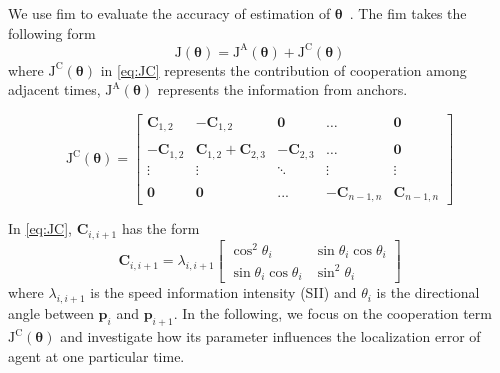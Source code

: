 \documentclass[conference]{IEEEtran}
\begin{document}
We use \ac{fim} to evaluate the accuracy of estimation of $\bm{\theta}$~\cite{LimitBound2}. The \ac{fim} takes the following form
\begin{equation}
\bm{\mathrm{J}}(\bm{\theta})=\bm{\mathrm{J}}^\mathrm{A}(\bm{\theta})+\bm{\mathrm{J}}^\mathrm{C}(\bm{\theta})
\end{equation}
where $\bm{\mathrm{J}}^\mathrm{C}(\bm{\theta})$ in \eqref{eq:JC} represents the contribution of cooperation among adjacent times, $\bm{\mathrm{J}}^\mathrm{A}(\bm{\theta})$ represents the information from anchors. 
\begin{figure}[t]
\begin{equation}\label{eq:JC}
\bm{\mathrm{J}}^\mathrm{C}(\bm{\theta})=
\begin{bmatrix}
\bm{C}_{1,2}&-\bm{C}_{1,2}&\bm{0}&\dots&\bm{0}\\
&&&&\\
-\bm{C}_{1,2} & \bm{C}_{1,2}+\bm{C}_{2,3}&-\bm{C}_{2,3}&\dots&\bm{0}\\
\vdots &\vdots&\ddots &\vdots&\vdots\\
&&&&\\
\bm{0}&\bm{0}&...& -\bm{C}_{n-1,n}&\bm{C}_{n-1,n}
\end{bmatrix}
\end{equation}
\hrulefill
\end{figure}
In \eqref{eq:JC}, $\bm{C}_{i,i+1}$ has the form
\begin{equation}
\bm{C}_{i,i+1}=\lambda_{i,i+1}\begin{bmatrix}
\cos^2 \theta_i & \sin \theta_i \cos \theta_i\\
\sin \theta_i \cos \theta_i & \sin^2 \theta_i 
\end{bmatrix}
\end{equation}
where $\lambda_{i,i+1}$ is the speed information intensity (SII) \cite{LimitBound2} 
and $\theta_i$ is the directional angle between $\bm{p}_i$ and $\bm{p}_{i+1}$. 
In the following, we focus on the cooperation term $\bm{\mathrm{J}}^\mathrm{C}(\bm{\theta})$ and 
investigate how its parameter influences the localization error of agent at one particular time.
\end{document}
